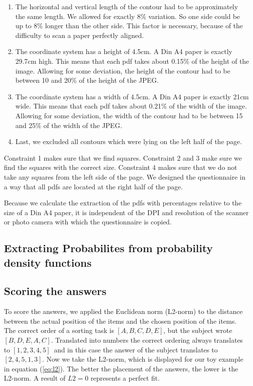 \documentclass[../main/main.tex]{subfiles}
\begin{document}
	\begin{enumerate}
		\item The horizontal and vertical length of the contour had to be approximately the same length. We allowed for exactly 8\% variation. So one side could be up to 8\% longer than the other side. This factor is necessary, because of the difficulty to scan a paper perfectly aligned.
		\item The coordinate system has a height of 4.5cm. A Din A4 paper is exactly 29.7cm high. This means that each pdf takes about 0.15\% of the height of the image. Allowing for some deviation, the height of the contour had to be between 10 and 20\% of the height of the JPEG. 
		\item The coordinate system has a width of 4.5cm. A Din A4 paper is exactly 21cm wide. This means that each pdf takes about 0.21\% of the width of the image. Allowing for some deviation, the width of the contour had to be between 15 and 25\% of the width of the JPEG. 
		\item Last, we excluded all contours which were lying on the left half of the page.
	\end{enumerate}

	\noindent Constraint 1 makes sure that we find squares. Constraint 2 and 3 make sure we find the squares with the correct size. Constraint 4 makes sure that we do not take any squares from the left side of the page. We designed the questionnaire in a way that all pdfs are located at the right half of the page.
	
	Because we calculate the extraction of the pdfs with percentages relative to the size of a Din A4 paper, it is independent of the DPI and resolution of the scanner or photo camera with which the questionnaire is copied.
	
	\subsection{Extracting Probabilites from probability density functions}
	
	\subsection{Scoring the answers}
	
	To score the answers, we applied the Euclidean norm (L2-norm) to the distance between the actual position of the items and the chosen position of the items. The correct order of a sorting task is $[A, B, C, D, E]$, but the subject wrote $[B, D, E, A, C]$. Translated into numbers the correct ordering always translates to $[1, 2, 3, 4, 5]$ and in this case the answer of the subject translates to $[2, 4, 5, 1, 3]$. Now we take the L2-norm, which is displayed for our toy example in equation (\ref{eq:l2}). The better the placement of the answers, the lower is the L2-norm. A result of $L2 = 0$ represents a perfect fit.
	
\end{document}
